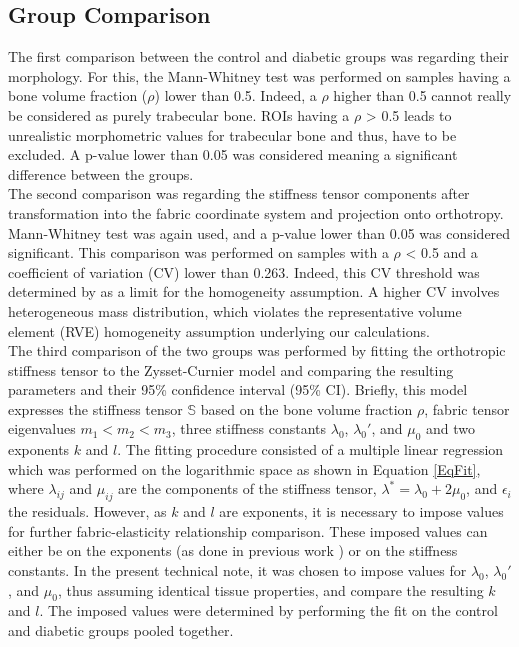\documentclass[a4paper,fleqn]{DC_ArtStyle}
\begin{document}
	\subsection{Group Comparison}
	The first comparison between the control and diabetic groups was regarding their morphology.
	For this, the Mann-Whitney test was performed on samples having a bone volume fraction ($\rho$) lower than 0.5.
	Indeed, a $\rho$ higher than 0.5 cannot really be considered as purely trabecular bone.
	ROIs having a $\rho$ > 0.5 leads to unrealistic morphometric values for trabecular bone and thus, have to be excluded.
	A p-value lower than 0.05 was considered meaning a significant difference between the groups.
	\\[0.5em]
	The second comparison was regarding the stiffness tensor components after transformation into the fabric coordinate system and projection onto orthotropy.
	Mann-Whitney test was again used, and a p-value lower than 0.05 was considered significant.
	This comparison was performed on samples with a $\rho$ < 0.5 and a coefficient of variation (CV) lower than 0.263.
	Indeed, this CV threshold was determined by \citeauthor{Panyasantisuk2015} \cite{Panyasantisuk2015} as a limit for the homogeneity assumption.
	A higher CV involves heterogeneous mass distribution, which violates the representative volume element (RVE) homogeneity assumption \cite{Cowin2007} underlying our calculations.
	\\[0.5em]
	The third comparison of the two groups was performed by fitting the orthotropic stiffness tensor to the Zysset-Curnier model \cite{Zysset1995} and comparing the resulting parameters and their 95\% confidence interval (95\% CI).
	Briefly, this model expresses the stiffness tensor $\mathbb{S}$ based on the bone volume fraction $\rho$, fabric tensor eigenvalues $m_1 < m_2 < m_3$, three stiffness constants $\lambda_0$, $\lambda_0'$, and $\mu_0$ and two exponents $k$ and $l$.
	The fitting procedure consisted of a multiple linear regression which was performed on the logarithmic space as shown in Equation \ref{EqFit}, where $\lambda_{ij}$ and $\mu_{ij}$ are the components of the stiffness tensor, $\lambda^{*} = \lambda_0 + 2\mu_0$, and $\epsilon_i$ the residuals.
	However, as $k$ and $l$ are exponents, it is necessary to impose values for further fabric-elasticity relationship comparison.
	These imposed values can either be on the exponents (as done in previous work \cite{Simon2022}) or on the stiffness constants.
	In the present technical note, it was chosen to impose values for $\lambda_0$, $\lambda_0'$, and $\mu_0$, thus assuming identical tissue properties, and compare the resulting $k$ and $l$.
	The imposed values were determined by performing the fit on the control and diabetic groups pooled together.
\end{document}
